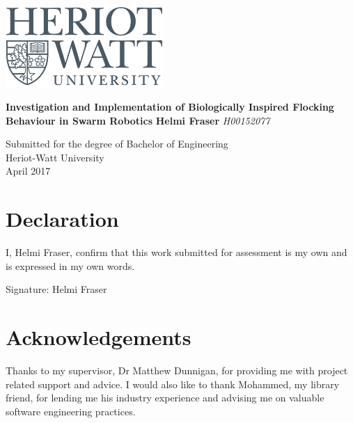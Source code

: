 \documentclass[a4paper,11pt]{report}
\newcommand{\linespacing}{1.5}
\renewcommand{\baselinestretch}{\linespacing}
\begin{document}




\thispagestyle{empty}
\begin{flushright}
\includegraphics[width=6cm]{HW_logo}
\end{flushright}	
\vskip40mm
\begin{center}
\huge\textbf{Investigation and Implementation of Biologically Inspired Flocking Behaviour in Swarm Robotics}
\vskip7mm
\Large\textbf{Helmi Fraser}
\vskip1mm
\Large\textit{H00152077}
\normalsize
\end{center}
\vfill
\begin{flushleft}
\large
Submitted for the degree of Bachelor of Engineering \\
Heriot-Watt University	\\
April 2017
\end{flushleft}		


\chapter*{Declaration}
I, Helmi Fraser, confirm that this work submitted for assessment is my own and is expressed in my own words.

\vskip5mm
Signature:
\vskip20mm
Helmi Fraser

\chapter*{Acknowledgements}
\renewcommand{\baselinestretch}{\linespacing}
\small\normalsize
Thanks to my supervisor, Dr Matthew Dunnigan, for providing me with project related support and advice. I would also like to thank Mohammed, my library friend, for lending me his industry experience and advising me on valuable software engineering practices. 
\end{document}
